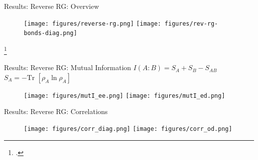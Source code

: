\documentclass[aspectratio=169]{beamer}
\begin{document}
\begin{frame}[noframenumbering]{Results: Reverse RG: Overview}
	\vspace*{\fill}
	\begin{figure}[htpb]
		\centering
		\texttt{[image: figures/reverse-rg.png]}
		\hspace*{\fill}
		\texttt{[image: figures/rev-rg-bonds-diag.png]}
	\end{figure}
	\vspace*{\fill}
\footcite{am_thesis}
\end{frame}

\begin{frame}[noframenumbering]{Results: Reverse RG: Mutual Information}
	\hspace*{\fill}	\(I(A:B) = S_A + S_B - S_{AB}\)\hspace*{\fill}\(S_A = -\text{Tr }\left[\rho_A \ln \rho_A\right]\)\hspace*{\fill}
	\begin{figure}[htpb]
		\centering
		\texttt{[image: figures/mutI\_ee.png]}\hspace*{\fill}
		\texttt{[image: figures/mutI\_ed.png]}
	\end{figure}
\end{frame}


\begin{frame}[noframenumbering]{Results: Reverse RG: Correlations}
	\begin{figure}[htpb]
		\centering
		\texttt{[image: figures/corr\_diag.png]}\hspace*{\fill}
		\texttt{[image: figures/corr\_od.png]}
	\end{figure}
\end{frame}
\end{document}
